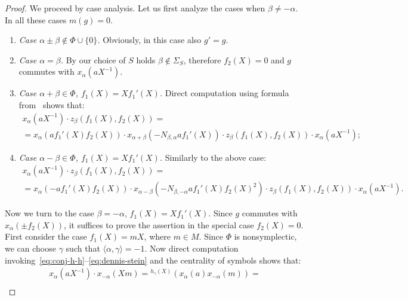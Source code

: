 \documentclass[oneside, 10pt]{amsart}
\theoremstyle{remark}
\theoremstyle{definition}
\numberwithin{equation}{section}
\begin{document}
\begin{proof}
 We proceed by case analysis. Let us first analyze the cases when $\beta \neq -\alpha$. In all these cases $m(g) = 0$.
 \begin{enumerate}
 \item {\it Case $\alpha \pm \beta \not \in \Phi \cup \{ 0\}$.}  Obviously, in this case also $g' = g$.
 \begin{comment} 
 \item {\it Case $\alpha + \beta \in \Phi$, $f_1(X) = Xf_1'(X)$, $f_2(X) = 0$.}
 \[ x_\alpha(aX^{-1}) \cdot x_\beta(Xf_1'(X)) = x_{\alpha+\beta}(af_1'(X))x_\beta(Xf_1'(X)) x_\alpha(aX^{-1}) \]
 \end{comment}
 \item {\it Case $\alpha = \beta$.} By our choice of $S$ holds $\beta \not \in \Sigma_S$, therefore $f_2(X) = 0$ and $g$ commutes with $x_\alpha(aX^{-1})$.
 \item {\it Case $\alpha + \beta \in \Phi$, $f_1(X) = Xf_1'(X)$.}
 Direct computation using formula from~\cite[Lemma~9]{S15} shows that:
 \begin{multline*}
 x_\alpha(aX^{-1}) \cdot z_\beta(f_1(X), f_2(X)) = \\ = x_\alpha(af_1'(X)f_2(X)) \cdot x_{\alpha+\beta}(-N_{\beta, \alpha} af_1'(X)) \cdot z_\beta(f_1(X), f_2(X)) \cdot x_\alpha(aX^{-1}); 
 \end{multline*}
 \item {\it Case $\alpha - \beta \in \Phi$, $f_1(X) = Xf_1'(X)$.} Similarly to the above case:
 \begin{multline*}
  x_{\alpha}(aX^{-1}) \cdot z_\beta(f_1(X), f_2(X)) = \\ = x_{\alpha}(-af_1'(X)f_2(X))\cdot x_{\alpha-\beta}(-N_{\beta,-\alpha} af_1'(X)f_2(X)^2) \cdot z_\beta(f_1(X), f_2(X)) \cdot x_{\alpha}(aX^{-1}).
 \end{multline*} \end{enumerate}
Now we turn to the case $\beta = -\alpha$, $f_1(X) = Xf_1'(X)$.
Since $g$ commutes with $x_\alpha(\pm f_2(X))$, it suffices to prove the assertion in the special case $f_2(X)=0$.
First consider the case $f_1(X) = mX$, where $m\in M$. Since $\Phi$ is nonsymplectic, we can choose $\gamma$ such that $\langle \alpha, \gamma \rangle = -1$.
Now direct computation invoking~\eqref{eq:conj-h-h}--\eqref{eq:dennis-stein} and the centrality of symbols shows that:
\begin{multline*}
 x_\alpha(aX^{-1}) \cdot x_{-\alpha}(X m) %
 = {}^{h_\gamma(X)}(x_\alpha(a) x_{-\alpha}(m)) = \\

\end{multline*}
\end{proof}
\end{document}
